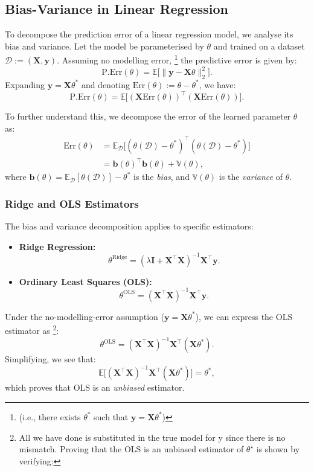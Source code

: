 \subsection{Bias-Variance in Linear Regression}

To decompose the prediction error of a linear regression model, we analyse its bias and variance. Let the model be parameterised by \(\theta\) and trained on a dataset \(\mathcal{D} := (\mathbf{X}, \mathbf{y})\). Assuming no modelling error, \footnote{(i.e., there exists \(\theta^*\) such that \(\mathbf{y} = \mathbf{X}\theta^*\))} the predictive error is given by:
\[
    \mathrm{P.Err}(\theta) = \mathbb{E}\big[ \|\mathbf{y} - \mathbf{X}\theta\|_2^2 \big].
\]
Expanding \(\mathbf{y} = \mathbf{X}\theta^*\) and denoting \(\mathrm{Err}(\theta) := \theta - \theta^*\), we have:
\[
    \mathrm{P.Err}(\theta) = \mathbb{E}\big[(\mathbf{X}\mathrm{Err}(\theta))^\top (\mathbf{X}\mathrm{Err}(\theta))\big].
\]

To further understand this, we decompose the error of the learned parameter \(\theta\) as:
\begin{align*}
    \text{Err}(\theta) & = \mathbb{E}_{\mathcal{D}}\big[(\theta(\mathcal{D}) - \theta^*)^\top (\theta(\mathcal{D}) - \theta^*)\big] \\
                       & = \mathbf{b}(\theta)^\top \mathbf{b}(\theta) + \mathbb{V}(\theta),
\end{align*}
where \(\mathbf{b}(\theta) = \mathbb{E}_{\mathcal{D}}[\theta(\mathcal{D})] - \theta^*\) is the \textit{bias}, and \(\mathbb{V}(\theta)\) is the \textit{variance} of \(\theta\).

\subsubsection{Ridge and OLS Estimators}
The bias and variance decomposition applies to specific estimators:
\begin{itemize}
    \item \textbf{Ridge Regression:}
          \[
              \theta^{\text{Ridge}} = (\lambda \mathbf{I} + \mathbf{X}^\top \mathbf{X})^{-1} \mathbf{X}^\top \mathbf{y}.
          \]
    \item \textbf{Ordinary Least Squares (OLS):}
          \[
              \theta^{\text{OLS}} = (\mathbf{X}^\top \mathbf{X})^{-1} \mathbf{X}^\top \mathbf{y}.
          \]
\end{itemize}

Under the no-modelling-error assumption (\(\mathbf{y} = \mathbf{X}\theta^*\)), we can express the OLS estimator as \footnote{All we have done is substituted in the true model for y since there is no mismatch. Proving
    that the OLS is an unbiased estimator of $\theta^\star$ is shown by verifying:}:
\[
    \theta^{\text{OLS}} = (\mathbf{X}^\top \mathbf{X})^{-1} \mathbf{X}^\top (\mathbf{X}\theta^*).
\]
Simplifying, we see that:
\[
    \mathbb{E}\big[(\mathbf{X}^\top \mathbf{X})^{-1} \mathbf{X}^\top (\mathbf{X}\theta^*)\big] = \theta^*,
\]
which proves that OLS is an \textit{unbiased} estimator.

